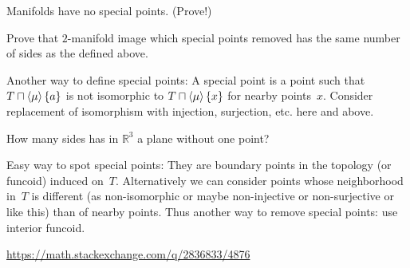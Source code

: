 \begin{rem}
Manifolds have no special points. (Prove!)
\end{rem}

Prove that $2$-manifold image which special points removed has the same number
of sides as the defined above.

Another way to define special points: A special point is a point
such that $T\sqcap\left\langle \mu\right\rangle\{a\}$ is not isomorphic to
$T\sqcap\left\langle \mu\right\rangle\{x\}$ for nearby points~$x$. Consider replacement
of isomorphism with injection, surjection, etc. here and above.

How many sides has in $\mathbb{R}^3$ a plane without one point?

Easy way to spot special points: They are boundary points in the
topology (or funcoid) induced on~$T$. Alternatively we can consider
points whose neighborhood in~$T$ is different (as non-isomorphic or
maybe non-injective or non-surjective or like this) than of nearby
points. Thus another way to remove special points: use interior funcoid.

\url{https://math.stackexchange.com/q/2836833/4876}
